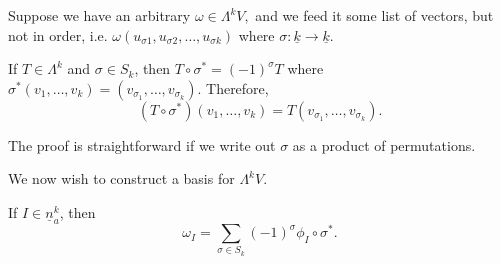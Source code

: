 \documentclass{article}
\numberwithin{equation}{section}
\begin{document}
Suppose we have an arbitrary $\omega \in \Lambda^kV,$ and we feed it some list of vectors, but not in order, i.e. $\omega(u_{\sigma 1}, u_{\sigma 2}, \dots, u_{\sigma k})$ where $\sigma: \underline{k} \to \underline{k}.$
\begin{lemma}
    If $T \in \Lambda^k$ and $\sigma \in S_k$, then $T\circ \sigma^* = (-1)^\sigma T$ where $\sigma^*(v_1,\dots,v_k) = (v_{\sigma_1}, \dots, v_{\sigma_k}).$ Therefore, 
    \begin{equation}
        (T\circ \sigma^*)(v_1,\dots,v_k) = T(v_{\sigma_1},\dots,v_{\sigma_k}).
    \end{equation}
\end{lemma}
The proof is straightforward if we write out $\sigma$ as a product of permutations.

We now wish to construct a basis for $\Lambda^k V$.
\begin{definition}
    If $I \in \underline{n}_a^k$, then 
    \begin{equation}
        \omega_I = \sum_{\sigma \in S_k}(-1)^{\sigma} \phi_I \circ \sigma^*.
    \end{equation}
\end{definition}
\end{document}
